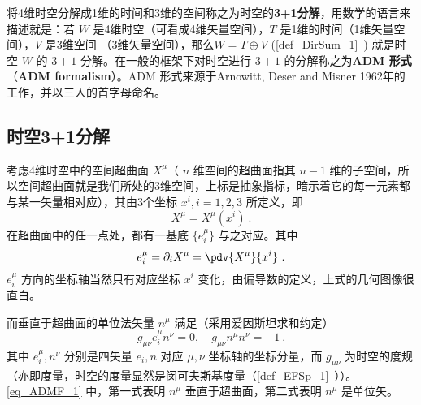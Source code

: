
\begin{issues}
\end{issues}


将4维时空分解成1维的时间和3维的空间称之为时空的\textbf{3+1分解}，用数学的语言来描述就是：若 $W$ 是4维时空（可看成4维矢量空间），$T$ 是1维的时间（1维矢量空间），$V$ 是3维空间 （3维矢量空间），那么$W=T\oplus V$ (\autoref{def_DirSum_1}~) 就是时空 $W$ 的 $3+1$ 分解。在一般的框架下对时空进行 $3+1$ 的分解称之为\textbf{ADM 形式}（\textbf{ADM formalism}）。ADM 形式来源于Arnowitt, Deser and Misner 1962年的工作，并以三人的首字母命名。
\subsection{时空3+1分解}
考虑4维时空中的空间超曲面 $X^\mu$（ $n$ 维空间的超曲面指其 $n-1$ 维的子空间，所以空间超曲面就是我们所处的3维空间，上标是抽象指标，暗示着它的每一元素都与某一矢量相对应），其由3个坐标 $x^i,i=1,2,3$ 所定义，即 
\begin{equation}
X^\mu=X^\mu(x^i)~.
\end{equation}
在超曲面中的任一点处，都有一基底 $\{e^\mu_i\}$ 与之对应。其中
\begin{equation}
e^\mu_i=\partial_i  X^\mu=\pdv{ X^\mu}{x^i}~.
\end{equation}
$e^\mu_i$ 方向的坐标轴当然只有对应坐标 $x^i$ 变化，由偏导数的定义，上式的几何图像很直白。

而垂直于超曲面的单位法矢量 $n^\mu$ 满足（采用爱因斯坦求和约定）
\begin{equation}\label{eq_ADMF_1}
g_{\mu\nu} e_i^\mu n^\nu=0,\quad g_{\mu\nu}n^\mu n^\nu=-1~.
\end{equation}
其中 $e_i^\mu,n^\nu$ 分别是四矢量 $ e_i,n$ 对应 $\mu,\nu$ 坐标轴的坐标分量，而 $g_{\mu\nu}$ 为时空的度规（亦即度量，时空的度量显然是闵可夫斯基度量（\autoref{def_EFSp_1}~））。\autoref{eq_ADMF_1} 中，第一式表明 $n^\mu$ 垂直于超曲面，第二式表明 $n^\mu$ 是单位矢。

